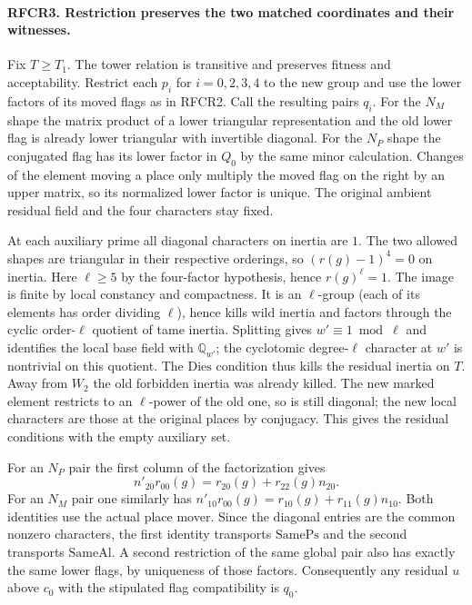 \paragraph{RFCR3. Restriction preserves the two matched coordinates and their witnesses.}
Fix $T\ge T_1$. The tower relation is transitive and preserves
fitness and acceptability. Restrict each $p_i$ for $i=0,2,3,4$ to
the new group and use the lower factors of its moved flags as in
RFCR2. Call the resulting pairs $q_i$. For the $N_M$ shape the
matrix product of a lower triangular representation and the old
lower flag is already lower triangular with invertible diagonal.
For the $N_P$ shape the conjugated flag has its lower factor in
$Q_0$ by the same minor calculation. Changes of the element moving
a place only multiply the moved flag on the right by an upper
matrix, so its normalized lower factor is unique. The original
ambient residual field and the four characters stay fixed.

At each auxiliary prime all diagonal characters on inertia are $1$.
The two allowed shapes are triangular in their respective orderings,
so $(r(g)-1)^4=0$ on inertia. Here $\ell\ge5$ by the four-factor
hypothesis, hence $r(g)^\ell=1$. The image is finite by local
constancy and compactness. It is an $\ell$-group (each of its elements
has order dividing $\ell$), hence kills wild inertia and factors
through the cyclic order-$\ell$ quotient of tame inertia. Splitting
gives $w'\equiv1\bmod\ell$ and identifies the local base field with
$\mathbb Q_{w'}$; the cyclotomic degree-$\ell$ character at $w'$
is nontrivial on this quotient. The $\mathrm{Dies}$ condition thus
kills the residual inertia on $T$. Away from $W_2$ the old forbidden
inertia was already killed. The new marked element restricts to an
$\ell$-power of the old one, so is still diagonal; the new local
characters are those at the original places by conjugacy. This gives
the residual conditions with the empty auxiliary set.

For an $N_P$ pair the first column of the factorization gives
\[
 n'_{20}r_{00}(g)=r_{20}(g)+r_{22}(g)n_{20}.
\]
For an $N_M$ pair one similarly has
$n'_{10}r_{00}(g)=r_{10}(g)+r_{11}(g)n_{10}$.
Both identities use the actual place mover. Since the diagonal entries
are the common nonzero characters, the first identity transports
$\mathrm{SamePs}$ and the second transports $\mathrm{SameAl}$.
A second restriction of the same global pair also has exactly the
same lower flags, by uniqueness of those factors. Consequently any
residual $u$ above $c_0$ with the stipulated flag compatibility is $q_0$.


